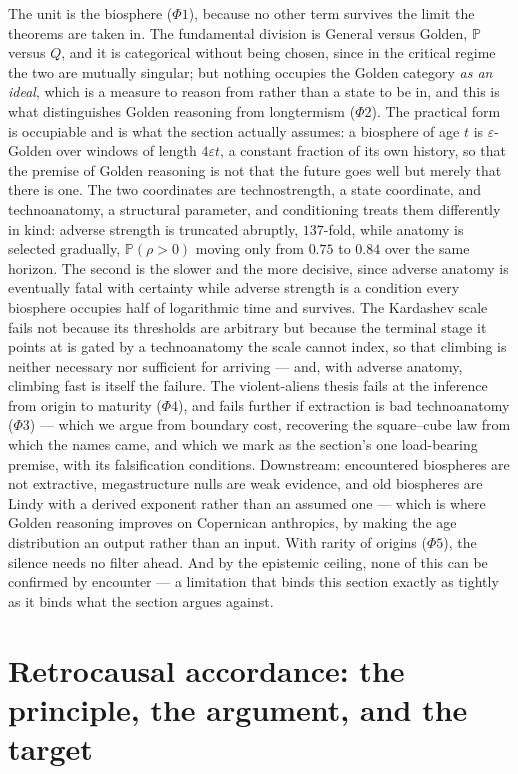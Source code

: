\documentclass[11pt]{article}
\numberwithin{equation}{section}
\theoremstyle{plain}
\theoremstyle{definition}
\theoremstyle{remark}
\newcommand{\PP}{\mathbb{P}}
\begin{document}
The unit is the biosphere ($\Phi1$), because no other term survives the
limit the theorems are taken in. The fundamental division is General
versus Golden, $\PP$ versus $Q$, and it is categorical without
being chosen, since in the critical regime the two are mutually
singular; but nothing occupies
the Golden category \emph{as an ideal}, which is a measure to reason
from rather than a state to be in, and this is what distinguishes Golden
reasoning from longtermism ($\Phi2$). The practical form is occupiable
and is what the section actually assumes: a biosphere of age $t$ is
$\varepsilon$-Golden over windows of length $4\varepsilon t$, a constant
fraction of its own history, so that the premise of Golden reasoning is
not that the future goes well but merely that there is one. The two coordinates are technostrength, a
state coordinate, and technoanatomy, a structural parameter, and
conditioning treats them differently in kind: adverse strength is
truncated abruptly, $137$-fold, while anatomy is selected gradually,
$\PP(\rho>0)$ moving only from $0.75$ to $0.84$ over the same horizon.
The second is the slower and the more decisive, since adverse anatomy is
eventually fatal with certainty while adverse strength is a condition
every biosphere occupies half of logarithmic time and survives. The Kardashev scale fails not because its
thresholds are arbitrary but because the terminal stage it points at is
gated by a technoanatomy the scale cannot index, so that climbing is
neither necessary nor sufficient for arriving --- and, with adverse
anatomy, climbing fast is itself the failure. The violent-aliens thesis fails at the
inference from origin to maturity ($\Phi4$), and fails further if
extraction is bad technoanatomy ($\Phi3$) --- which we argue from
boundary cost, recovering the square--cube law from which the names
came, and which we mark as the section's one load-bearing premise, with
its falsification conditions. Downstream: encountered biospheres are not
extractive, megastructure nulls are weak evidence, and old biospheres
are Lindy with a derived exponent rather than an assumed one --- which
is where Golden reasoning improves on Copernican anthropics, by making
the age distribution an output rather than an input. With rarity of
origins ($\Phi5$), the silence needs no filter ahead. And by the
epistemic ceiling, none of this can be confirmed by encounter --- a
limitation that binds this section exactly as tightly as it binds what
the section argues against.

\section{Retrocausal accordance: the principle, the argument, and the
target}\label{ra:sec}
\end{document}
